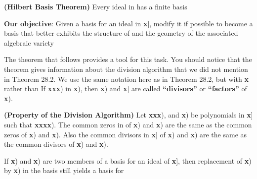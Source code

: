 \documentclass[11pt,oneside]{article}
\begin{document}
\begin{BookBody}
 \textbf{(Hilbert Basis Theorem)} Every ideal  in  has a finite basis\BookEnd{\blacklozenge}

\noindent \textbf{Our objective}: Given a basis for an ideal  in \BookInline{F[}\textbf{x}], modify it if possible to become a basis that better exhibits the structure of  and the geometry of the associated algebraic variety 

\end{BookBody}

\BookNarrativetrue

\begin{BookBody}

The theorem that follows provides a tool for this task. You should notice that the theorem gives information about the division algorithm that we did not mention in Theorem 28.2. We use the same notation here as in Theorem 28.2, but with\textbf{ x} rather than  If \textbf{x}\textbf{x}\textbf{x}) in \textbf{x}), then \textbf{x}) and \BookInline{h[}\textbf{x}] are called\textbf{ “divisors”} or\textbf{ “factors”} of \textbf{x}).

 \textbf{(Property of the Division Algorithm)} Let \textbf{x}\textbf{x}\textbf{x}), and \textbf{x}) be polynomials in \BookInline{F[}\textbf{x}] such that \textbf{x}\textbf{x}\textbf{x}\textbf{x}). The common zeros in  of \textbf{x}) and \textbf{x}) are the same as the common zeros of \textbf{x}) and \textbf{x}). Also the common divisors in \BookInline{F[}\textbf{x}] of \textbf{x}) and \textbf{x}) are the same as the common divisors of \textbf{x}) and \textbf{x}).

If \textbf{x}) and \textbf{x}) are two members of a basis for an ideal  of \BookInline{F[}\textbf{x}], then replacement of \textbf{x}) by \textbf{x}) in the basis still yields a basis for 


\end{BookBody}
\end{document}
